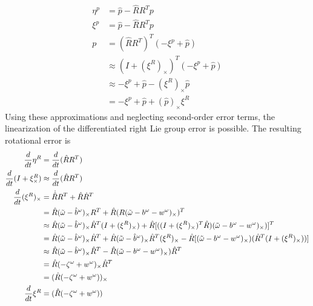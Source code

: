 \begin{equation}
    \begin{split}
        \eta^p & = \hat{p} - \hat{R} R^T p \\ 
        \xi^p & = \hat{p} - \hat{R} R^T p \\ 
        p &= (\hat{R} R^T)^T (-\xi^p + \hat{p}) \\
        & \approx (I + (\xi^R)_{\times})^T (-\xi^p + \hat{p}) \\
        & \approx -\xi^p + \hat{p} - (\xi^R)_{\times} \hat{p} \\
        & = -\xi^p + \hat{p} + (\hat{p})_{\times} \xi^R
        \label{eq: approx true p InEKF}        
    \end{split}
\end{equation}
Using these approximations and neglecting second-order error terms, the linearization of the differentiated right Lie group error is possible. The resulting rotational error is
\begin{equation}
    \begin{split}
        \frac{d}{dt} \eta^R &= \frac{d}{dt} (\hat{R} R^T) \\
        \frac{d}{dt} (I + \xi^R_{\times}) &\approx \frac{d}{dt} (\hat{R} R^T) \\
        \frac{d}{dt} (\xi^R)_{\times} &= \dot{\hat{R}} R^T + \hat{R} \dot{R}^T \\
        &= \hat{R} (\Tilde{\omega} - \hat{b}^{\omega})_{\times} R^T + \hat{R} (R (\Tilde{\omega} -b^{\omega} - w^{\omega})_{\times})^T \\
        &\approx  \hat{R} (\Tilde{\omega} - \hat{b}^{\omega})_{\times} \hat{R}^T (I + (\xi^R)_{\times}) + \hat{R} [((I + (\xi^R)_{\times})^T \hat{R} ) (\Tilde{\omega} -b^{\omega} - w^{\omega})_{\times})]^T \\
        &= \hat{R} (\Tilde{\omega} - \hat{b}^{\omega})_{\times} \hat{R}^T +
            \hat{R} (\Tilde{\omega} - \hat{b}^{\omega})_{\times} \hat{R}^T (\xi^R)_{\times} - 
            \hat{R} [ (\Tilde{\omega} -b^{\omega} - w^{\omega})_{\times}) (\hat{R}^T (I + (\xi^R)_{\times}))]\\
        &\approx \hat{R} (\Tilde{\omega} - \hat{b}^{\omega})_{\times} \hat{R}^T - 
           \hat{R} (\Tilde{\omega} -b^{\omega} - w^{\omega})_{\times}) \hat{R}^T \\
       &= \hat{R} (-\zeta^{\omega} + w^{\omega})_{\times} \hat{R}^T \\
       &= (\hat{R} (-\zeta^{\omega} + w^{\omega}))_{\times} \\
       \frac{d}{dt} \xi^R &=  (\hat{R} (-\zeta^{\omega} + w^{\omega}))
        \label{eq: R linearized RInEKF}
    \end{split}
\end{equation}
